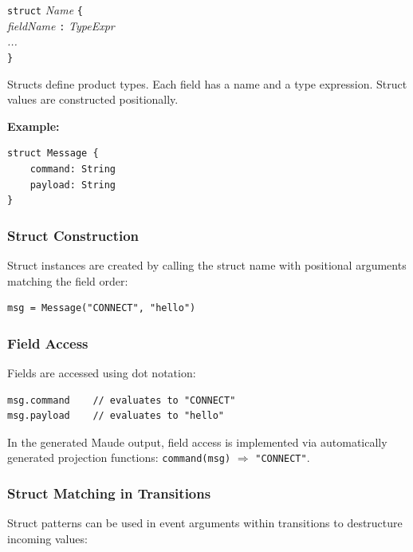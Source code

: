 \documentclass[11pt,letterpaper]{article}
\begin{document}
\begin{syntaxbox}[struct]
\texttt{struct} \textit{Name} \texttt{\{} \\
\hspace*{2em}\textit{fieldName} \texttt{:} \textit{TypeExpr} \\
\hspace*{2em}\textit{...} \\
\texttt{\}}
\end{syntaxbox}

Structs define product types.  Each field has a name and a type
expression.  Struct values are constructed positionally.

\textbf{Example:}
\begin{lstlisting}
struct Message {
    command: String
    payload: String
}
\end{lstlisting}

\subsubsection{Struct Construction}

Struct instances are created by calling the struct name with positional
arguments matching the field order:

\begin{lstlisting}[numbers=none]
msg = Message("CONNECT", "hello")
\end{lstlisting}

\subsubsection{Field Access}

Fields are accessed using dot notation:

\begin{lstlisting}[numbers=none]
msg.command    // evaluates to "CONNECT"
msg.payload    // evaluates to "hello"
\end{lstlisting}

In the generated Maude output, field access is implemented via
automatically generated projection functions:
\texttt{command(msg)} $\Rightarrow$ \texttt{"CONNECT"}.

\subsubsection{Struct Matching in Transitions}

Struct patterns can be used in event arguments within transitions to
destructure incoming values:
\end{document}
